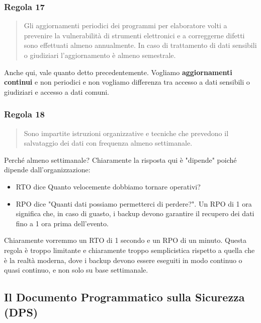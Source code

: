 \subsubsection*{Regola 17}
\begin{quote}
    Gli aggiornamenti periodici dei programmi per elaboratore volti a prevenire la vulnerabilità di strumenti elettronici e a correggerne difetti sono effettuati almeno annualmente. In caso di trattamento di dati sensibili o giudiziari l'aggiornamento è almeno semestrale.
\end{quote}

Anche qui, vale quanto detto precedentemente.
Vogliamo \textbf{aggiornamenti continui} e non periodici e non vogliamo differenza tra accesso a dati sensibili o giudiziari e accesso a dati comuni.
\subsubsection*{Regola 18}
\begin{quote}
    Sono impartite istruzioni organizzative e tecniche che prevedono il salvataggio dei dati con frequenza almeno settimanale.
\end{quote}
Perché almeno settimanale?
Chiaramente la risposta qui è "dipende" poiché dipende dall'organizzazione:
\begin{itemize}
    \item RTO dice Quanto velocemente dobbiamo tornare operativi?
    \item RPO dice "Quanti dati possiamo permetterci di perdere?". Un RPO di 1 ora significa che, in caso di guasto, i backup devono garantire il recupero dei dati fino a 1 ora prima dell'evento.
\end{itemize}
Chiaramente vorremmo un RTO di 1 secondo e un RPO di un minuto.
Questa regola è troppo limitante e chiaramente troppo semplicistica rispetto a quella che è la realtà moderna, dove i backup devono essere eseguiti in modo continuo o quasi continuo, e non solo su base settimanale.
\subsection{Il Documento Programmatico sulla Sicurezza (DPS)}

